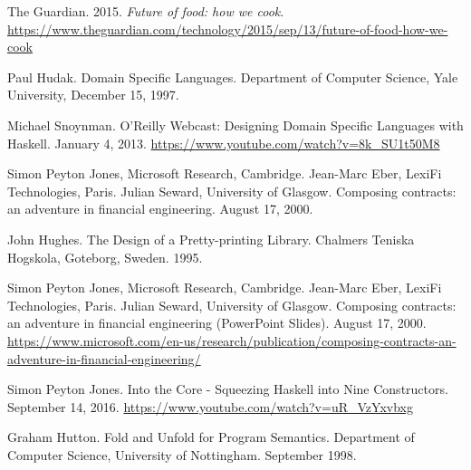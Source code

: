 \documentclass[11pt]{article}
\begin{document}
    \begin{thebibliography}{8}

        The Guardian. 2015. \textit{Future of food: how we cook}.
        \url{https://www.theguardian.com/technology/2015/sep/13/future-of-food-how-we-cook}

        Paul Hudak. Domain Specific Languages. Department of Computer
        Science, Yale University, December 15, 1997.

        Michael Snoynman. O'Reilly Webcast: Designing Domain Specific
        Languages with Haskell. January 4, 2013.
        \url{https://www.youtube.com/watch?v=8k_SU1t50M8}

        Simon Peyton Jones, Microsoft Research, Cambridge.
        Jean-Marc Eber, LexiFi Technologies, Paris. Julian Seward,
        University of Glasgow. Composing contracts: an adventure in
        financial engineering. August 17, 2000.

        John Hughes. The Design of a Pretty-printing Library.
        Chalmers Teniska Hogskola, Goteborg, Sweden. 1995.

        Simon Peyton Jones, Microsoft Research, Cambridge.
        Jean-Marc Eber, LexiFi Technologies, Paris. Julian Seward,
        University of Glasgow. Composing contracts: an adventure in
        financial engineering (PowerPoint Slides). August 17, 2000.
        \url{https://www.microsoft.com/en-us/research/publication/composing-contracts-an-adventure-in-financial-engineering/}

        Simon Peyton Jones. Into the Core - Squeezing Haskell into
        Nine Constructors. September 14, 2016.
        \url{https://www.youtube.com/watch?v=uR_VzYxvbxg}

        Graham Hutton. Fold and Unfold for Program Semantics. Department of
        Computer Science, University of Nottingham. September 1998.

    \end{thebibliography}   

    \newpage

    \appendix
\end{document}
